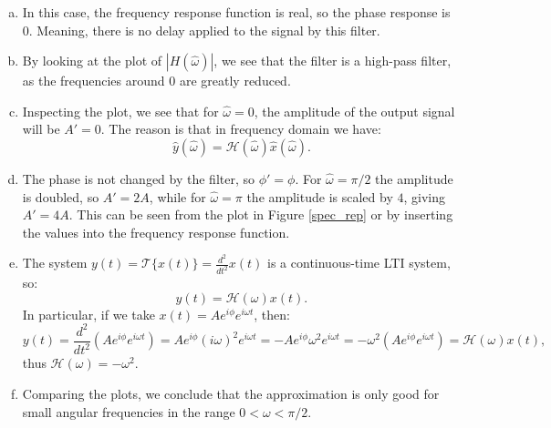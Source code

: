 \begin{enumerate}
\begin{enumerate}[a)]
\item In this case, the frequency response function is real, so the phase response is $0$. Meaning, there is no delay applied to the signal by this filter.

\item By looking at the plot of $|H(\hat{\omega})|$, we see that the filter is a high-pass filter, as the frequencies around $0$ are greatly reduced. 

\item Inspecting the plot, we see that for $\hat{\omega}=0$, the amplitude of the output signal will be $A'=0$. The reason is that in frequency domain we have:
$$\hat{y}(\hat{\omega})=\mathcal{H}(\hat{\omega})\hat{x}(\hat{\omega}).$$

\item The phase is not changed by the filter, so $\phi'=\phi$. For $\hat{\omega}=\pi/2$ the amplitude is doubled, so $A'=2A$, while for $\hat{\omega}=\pi$ the amplitude is scaled by $4$, giving $A'=4A$. 
This can be seen from the plot in Figure \ref{spec_rep} or by inserting the values into the frequency response function. 

\item The system $y(t)=\mathcal{T}\{x(t)\}=\frac{d^{2}}{dt^{2}}x(t)$ is a continuous-time LTI system, so:
$$y(t)=\mathcal{H}(\omega)x(t).$$
In particular, if we take $x(t)=Ae^{i\phi}e^{i\omega t}$, then:
$$y(t)=\frac{d^{2}}{dt^{2}}(Ae^{i\phi}e^{i\omega t})=Ae^{i\phi}(i\omega)^{2}e^{i\omega t}=-Ae^{i\phi}\omega^{2}e^{i\omega t}=-\omega^{2}(Ae^{i\phi}e^{i\omega t})=\mathcal{H}(\omega)x(t),$$
thus $\mathcal{H}(\omega)=-\omega^{2}$. 

\item Comparing the plots, we conclude that the approximation is only good for small angular frequencies in the range $0<\omega<\pi/2$. 
\end{enumerate}

\end{enumerate}


